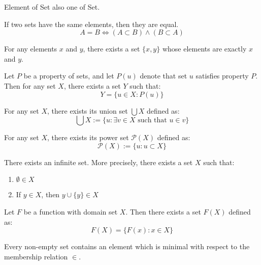 \documentclass[11pt,lang=en]{elegantbook}
\begin{document}
\begin{remark}
  Element of Set also one of Set.
\end{remark}

\begin{axiom}
  If two sets have the same elements, then they are equal.
  \[
  A=B \iff (A \subset B) \land (B \subset A) 
  \]
\end{axiom}

\begin{axiom}
  For any elements $x$ and $y$, there exists a set $\{x,y\}$ whose elements are exactly $x$ and $y$.
\end{axiom}



\begin{axiom}
  Let $P$ be a property of sets, and let $P(u)$ denote that set $u$ satisfies property $P$. Then for any set $X$, there exists a set $Y$ such that:
  \[
    Y = \{u \in X : P(u)\}
  \]
\end{axiom}

\begin{axiom}
  For any set $X$, there exists its union set $\bigcup X$ defined as:
  \[
    \bigcup X := \{u : \exists v \in X \text{ such that } u \in v\}
  \]
\end{axiom}

\begin{axiom}
  For any set $X$, there exists its power set $\mathcal{P}(X)$ defined as:
  \[
    \mathcal{P}(X) := \{u : u \subset X\}
  \]
\end{axiom}

\begin{axiom}
  There exists an infinite set. More precisely, there exists a set $X$ such that:
  \begin{enumerate}
    \item $\emptyset \in X$
    \item If $y \in X$, then $y \cup \{y\} \in X$
  \end{enumerate}
\end{axiom}

\begin{axiom}
  Let $F$ be a function with domain set $X$. Then there exists a set $F(X)$ defined as:
  \[
    F(X) = \{F(x) : x \in X\}
  \]
\end{axiom}

\begin{axiom}
  Every non-empty set contains an element which is minimal with respect to the membership relation $\in$. 
\end{axiom}
\end{document}
